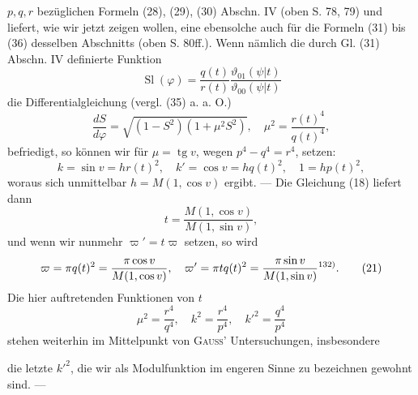 \(p,q,r\) bezüglichen Formeln (28), (29), (30) Abschn. IV (oben S. 78, 79) und
liefert, wie wir jetzt zeigen wollen, eine ebensolche auch für die Formeln
(31) bis (36) desselben Abschnitts (oben S. 80ff.). Wenn nämlich die durch
Gl. (31) Abschn. IV definierte Funktion
\[
\operatorname{Sl}(\varphi)=\frac{q(t)}{r(t)}\frac{\vartheta_{01}(\psi|t)}{\vartheta_{00}(\psi|t)}
\]
\noindent die Differentialgleichung (vergl. (35) a. a. O.)
\[
\frac{dS}{d\varphi}=\sqrt{(1-S^2)(1+\mu^2S^2)},\quad\mu^2=\frac{r(t)^4}{q(t)^4},
\]
\noindent befriedigt, so können wir für \(\mu=\operatorname{tg}v\), wegen \(p^4-q^4=r^4\), setzen:
\begingroup\makeatletter\tagsleft@true\let\veqno\leqno\makeatother
\begin{equation*}
k=\sin v=hr(t)^2,\quad k'=\cos v=hq(t)^2,\quad1=hp(t)^2,\tag{19}
\end{equation*}
\endgroup
\noindent woraus sich unmittelbar \(h=M(1,\cos v)\) ergibt. — Die Gleichung (18) liefert
dann
\begingroup\makeatletter\tagsleft@true\let\veqno\leqno\makeatother
\begin{equation*}
t=\frac{M(1,\cos v)}{M(1,\sin v)},\tag{20}
\end{equation*}
\endgroup
\noindent und wenn wir nunmehr \(\varpi'=t\varpi\) setzen, so wird
\begingroup\makeatletter\tagsleft@true\let\veqno\leqno\makeatother
\begin{equation*}
\varpi=\pi q(t)^2=\frac{\pi\cos v}{M(1,\cos v)},\quad
\varpi'=\pi tq(t)^2=\frac{\pi\sin v}{M(1,\sin v)}\text{\textsuperscript{132)}}.\tag{21}
\end{equation*}
\endgroup
{}
\noindent Die hier auftretenden Funktionen von \(t\)
\[
\mu^2=\frac{r^4}{q^4},\quad k^2=\frac{r^4}{p^4},\quad k'^2=\frac{q^4}{p^4}
\]
\noindent stehen weiterhin im Mittelpunkt von \textsc{Gauss'} Untersuchungen, insbesondere\par
\clearpage{}
\noindent die letzte \(k'^2\), die wir als Modulfunktion im engeren Sinne zu bezeichnen gewohnt sind. —
